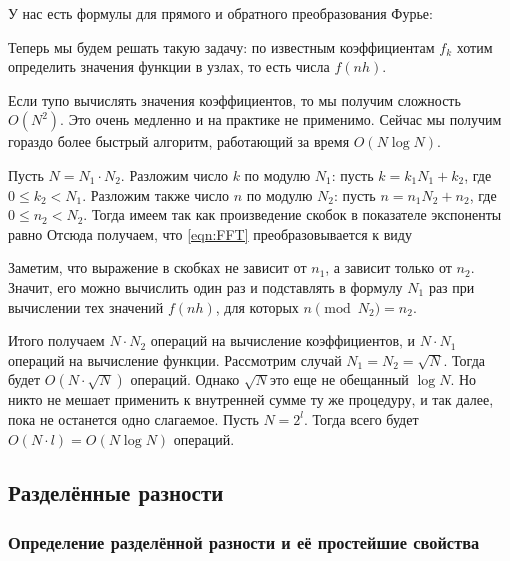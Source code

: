 \documentclass[a4paper]{article}
\begin{document}
У нас есть формулы для прямого и обратного преобразования Фурье:


Теперь мы будем решать такую задачу: по известным коэффициентам $f_k$ хотим определить значения функции в узлах, то есть
числа $f(nh)$.


Если тупо вычислять значения коэффициентов, то мы получим сложность $O(N^2)$. Это очень медленно и на практике
не применимо. Сейчас мы получим гораздо более быстрый алгоритм, работающий за время $O(N\log N)$.

Пусть $N=N_1\cdot N_2$. Разложим число $k$ по модулю $N_1$: пусть $k = k_1N_1 + k_2$, где $0\le k_2 < N_1$.
Разложим также число $n$ по модулю $N_2$: пусть $n = n_1 N_2 + n_2$, где $0\le n_2 < N_2$.
Тогда имеем
так как произведение скобок в показателе экспоненты равно
Отсюда получаем, что \eqref{eqn:FFT} преобразовывается к виду

Заметим, что выражение в скобках не зависит от $n_1$, а зависит только от $n_2$. Значит, его можно вычислить один
раз и подставлять в формулу $N_1$ раз при вычислении тех значений $f(nh)$, для которых $n \pmod{N_2} =  n_2$.

Итого получаем $N \cdot N_2$ операций на вычисление коэффициентов, и $N\cdot N_1$ операций на вычисление функции.
Рассмотрим случай $N_1 = N_2 = \sqrt N$. Тогда будет $O(N\cdot \sqrt N)$ операций.
Однако $\sqrt N$\т это еще не обещанный $\log N$. Но никто не мешает применить к внутренней сумме ту же процедуру,
и так далее, пока не останется одно слагаемое.
Пусть $N = 2^l$. Тогда всего будет $O(N\cdot l) = O(N \log N)$ операций.

\subsection{Разделённые разности}

\subsubsection{Определение разделённой разности и её простейшие свойства}
\end{document}
